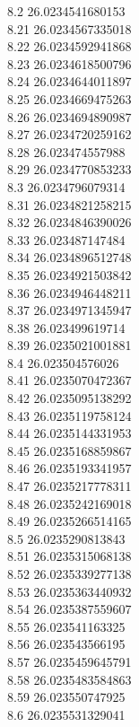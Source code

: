 {8.2	26.0234541680153\\
8.21	26.0234567335018\\
8.22	26.0234592941868\\
8.23	26.0234618500796\\
8.24	26.0234644011897\\
8.25	26.0234669475263\\
8.26	26.0234694890987\\
8.27	26.0234720259162\\
8.28	26.023474557988\\
8.29	26.0234770853233\\
8.3	26.0234796079314\\
8.31	26.0234821258215\\
8.32	26.0234846390026\\
8.33	26.023487147484\\
8.34	26.0234896512748\\
8.35	26.0234921503842\\
8.36	26.0234946448211\\
8.37	26.0234971345947\\
8.38	26.023499619714\\
8.39	26.0235021001881\\
8.4	26.023504576026\\
8.41	26.0235070472367\\
8.42	26.0235095138292\\
8.43	26.0235119758124\\
8.44	26.0235144331953\\
8.45	26.0235168859867\\
8.46	26.0235193341957\\
8.47	26.0235217778311\\
8.48	26.0235242169018\\
8.49	26.0235266514165\\
8.5	26.0235290813843\\
8.51	26.0235315068138\\
8.52	26.0235339277138\\
8.53	26.0235363440932\\
8.54	26.0235387559607\\
8.55	26.023541163325\\
8.56	26.023543566195\\
8.57	26.0235459645791\\
8.58	26.0235483584863\\
8.59	26.023550747925\\
8.6	26.0235531329041\\
}
